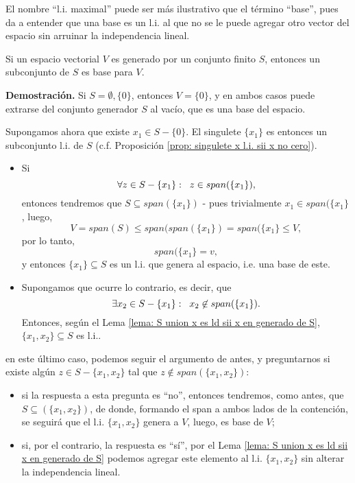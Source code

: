 El nombre ``l.i. maximal'' puede ser más ilustrativo que el 
término ``base'', pues da a entender que una base es un l.i. al que
no se le puede agregar otro vector del espacio sin arruinar la independencia lineal.

\begin{teo}
	\label{teo: extrayendo bases de generadores finitos}
 Si un espacio vectorial $V$ es generado
por un conjunto finito $S$, entonces un subconjunto de $S$
es base para $V$.
\end{teo}
\noindent
\textbf{Demostración.}
Si $S= \emptyset, \{ 0 \}$, entonces $V = \{ 0 \}$, y en ambos
casos puede extrarse del conjunto generador $S$ al vacío,
que es una base del espacio.

Supongamos ahora que existe $x_{1} \in S - \{ 0\}$.
El singulete 
$\{ x_{1} \}$ es entonces un subconjunto l.i. de $S$
(c.f. Proposición 
\ref{prop: singulete x l.i. sii x no cero}).
\begin{itemize}
	\item Si  
	\[
	\forall z \in S - \{x_{1}\}: \hspace{0.2cm}
	z \in span(\{x_{1}\}),
	\]
	entonces tendremos que $S \subseteq span(\{x_{1}\})$ - pues trivialmente
	$x_{1} \in span(\{x_{1}\}$, luego, 
	\[
	V = span(S) \leq span(span(\{x_{1}\}) = span(\{x_{1}\} \leq V,
	\]
	por lo tanto, 
	\[
	span(\{x_{1}\} = v,
	\]
	y entonces $\{ x_{1}\} \subseteq S$ es un l.i. que genera al espacio, 
	i.e. una base de este.
	\item Supongamos que ocurre lo contrario, es decir, que 
	\[
	\exists x_{2} \in S-\{x_{1}\} : \hspace{0.2cm}
	x_{2} \not\in span(\{x_{1}\}).
	\]
	Entonces, según el Lema 
	\ref{lema: S union x es ld sii x en generado de S}, 
	$\{ x_{1}, x_{2}\} \subseteq S$ es l.i..
\end{itemize}
en este último caso, podemos seguir el argumento de antes, y preguntarnos
si existe algún $z \in S - \{ x_{1}, x_{2} \}$ tal que 
$z \not\in span(\{x_{1}, x_{2}\})$:
\begin{itemize}
	\item si la respuesta a esta pregunta es ``no'', entonces tendremos,
	como antes, que $S \subseteq(\{ x_{1}, x_{2} \})$, de donde, formando
	el span a ambos lados de la contención, se seguirá que el l.i.
	$\{x_{1}, x_{2}\}$ genera a $V$, luego, es base de $V$;
	\item si, por el contrario, la respuesta es ``sí'', por el Lema 
	\ref{lema: S union x es ld sii x en generado de S} podemos agregar este
	elemento al l.i. $\{x_{1}, x_{2}\}$ sin alterar la independencia lineal.
\end{itemize}


